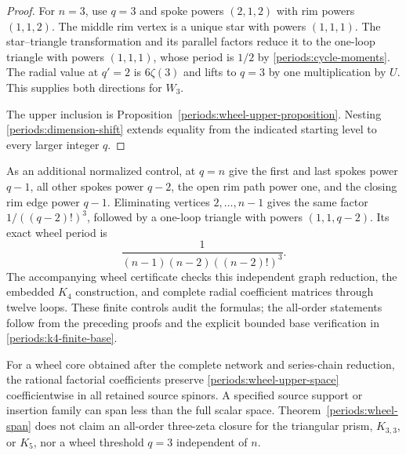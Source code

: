 \begin{proof}
For $n=3$, use $q=3$ and spoke powers $(2,1,2)$ with rim powers
$(1,1,2)$.  The middle rim vertex is a unique star with powers $(1,1,1)$.
The star--triangle transformation and its parallel factors reduce it
to the one-loop triangle with powers $(1,1,1)$, whose period is $1/2$
by \eqref{periods:cycle-moments}.  The radial value at $q'=2$ is
$6\zeta(3)$ and lifts to $q=3$ by one multiplication by $U$.
This supplies both directions for $W_3$.

The upper inclusion is Proposition~\ref{periods:wheel-upper-proposition}.
Nesting \eqref{periods:dimension-shift} extends equality from the
indicated starting level to every larger integer $q$.
\end{proof}

As an additional normalized control, at $q=n$ give the first and last
spokes power $q-1$, all other spokes power $q-2$, the open rim path
power one, and the closing rim edge power $q-1$.  Eliminating vertices
$2,\ldots,n-1$ gives the same factor $1/((q-2)!)^3$, followed by a
one-loop triangle with powers $(1,1,q-2)$.  Its exact wheel period is
\begin{equation}
 \frac{1}{(n-1)(n-2)((n-2)!)^3}.
 \label{periods:rational-wheel-control}
\end{equation}
The accompanying wheel certificate checks this independent graph
reduction, the embedded $K_4$ construction, and complete radial coefficient
matrices through twelve loops.  These finite controls audit the formulas;
the all-order statements follow from the preceding proofs and the
explicit bounded base verification in
\eqref{periods:k4-finite-base}.

For a wheel core obtained after the complete network and series-chain
reduction, the rational factorial coefficients preserve
\eqref{periods:wheel-upper-space} coefficientwise in all retained source
spinors.  A specified source support or insertion family can span less
than the full scalar space.  Theorem~\ref{periods:wheel-span} does not
claim an all-order three-zeta closure for the triangular prism,
$K_{3,3}$, or $K_5$, nor a wheel threshold $q=3$ independent of $n$.
